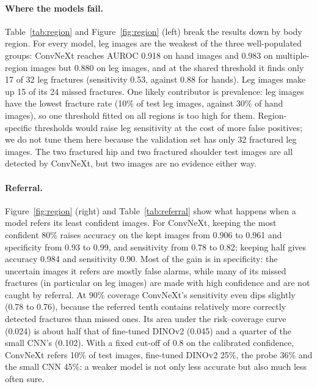 \documentclass[11pt,a4paper]{article}
\begin{document}
\paragraph{Where the models fail.} Table~\ref{tab:region} and Figure~\ref{fig:region} (left) break the results down
by body region. For every model, leg images are the weakest of the three well-populated groups: ConvNeXt reaches
AUROC 0.918 on hand images and 0.983 on multiple-region images but 0.880 on leg images, and at the shared threshold
it finds only 17 of 32 leg fractures (sensitivity 0.53, against 0.88 for hands). Leg images make up 15 of its 24
missed fractures. One likely contributor is prevalence: leg images have the lowest fracture rate (10\% of test leg images, against
30\% of hand images), so one threshold fitted on all regions is too high for them. Region-specific thresholds would raise leg sensitivity at the cost of more false positives;
we do not tune them here because the validation set has only 32 fractured leg images. The two fractured hip and two
fractured shoulder test images are all detected by ConvNeXt, but two images are no evidence either way.

\paragraph{Referral.} Figure~\ref{fig:region} (right) and Table~\ref{tab:referral} show what happens when a model
refers its least confident images. For ConvNeXt, keeping the most confident 80\% raises accuracy on the kept images
from 0.906 to 0.961 and specificity from 0.93 to 0.99, and sensitivity from 0.78 to 0.82; keeping half gives accuracy
0.984 and sensitivity 0.90. Most of the gain is in specificity: the uncertain images it refers are mostly false
alarms, while many of its missed fractures (in particular on leg images) are made with high confidence and are not
caught by referral. At 90\% coverage ConvNeXt's sensitivity even dips slightly (0.78 to 0.76), because the referred
tenth contains relatively more correctly detected fractures than missed ones. Its area under the risk--coverage
curve (0.024) is about half that of fine-tuned DINOv2 (0.045) and a quarter of the small CNN's (0.102). With a fixed
cut-off of 0.8 on the calibrated confidence, ConvNeXt refers 10\% of test images, fine-tuned DINOv2 25\%, the probe
36\% and the small CNN 45\%: a weaker model is not only less accurate but also much less often sure.
\end{document}
